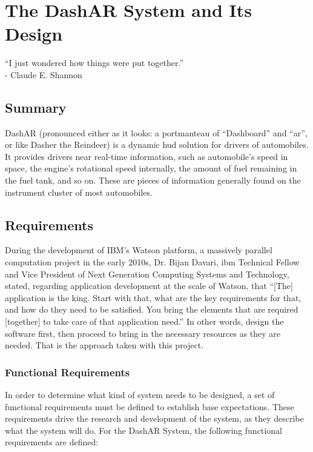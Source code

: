 \chapter{The DashAR System and Its Design}
\label{chap:design}

\begin{center}
    ``I just wondered how things were put together.'' \\
    - Claude E. Shannon \cite{Soni2021}
\end{center}

\section{Summary}
    \par DashAR (pronounced either as it looks: a portmanteau of ``Dashboard'' and ``\gls{ar}'', or like Dasher the Reindeer) is a dynamic \gls{hud} solution for drivers of automobiles. It provides drivers near real-time information, such as automobile's speed in space, the engine's rotational speed internally, the amount of fuel remaining in the fuel tank, and so on. These are pieces of information generally found on the instrument cluster of most automobiles.

\section{Requirements}
    \par During the development of IBM's Watson platform, a massively parallel computation project in the early 2010s, Dr. Bijan Davari, \gls{ibm} Technical Fellow and Vice President of Next Generation Computing Systems and Technology, stated, regarding application development at the scale of Watson, that ``[The] application is the king. Start with that, what are the key requirements for that, and how do they need to be satisfied. You bring the elements that are required [together] to take care of that application need.'' \cite{IBM2012} In other words, design the software first, then proceed to bring in the necessary resources as they are needed. That is the approach taken with this project.

    \subsection{Functional Requirements}
        \par In order to determine what kind of system needs to be designed, a set of functional requirements must be defined to establish base expectations. These requirements drive the research and development of the system, as they describe what the system will do. For the DashAR System, the following functional requirements are defined:

